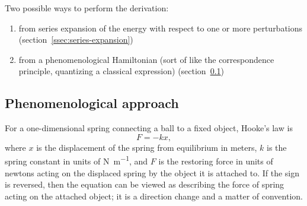 \documentclass[%
class = book,%
crop = false,%
float = true,%
multi = true,%
preview = false,%
]{standalone}
\begin{document}
Two possible ways to perform the derivation:

\begin{enumerate}
\item from series expansion of the energy with respect to one or more perturbations (section~\ref{ssec:series-expansion})
\item from a phenomenological Hamiltonian (sort of like the correspondence principle, quantizing a classical expression) (section~\ref{ssec:phenomenological-approach})
\end{enumerate}

\subsection{Phenomenological approach}
\label{ssec:phenomenological-approach}

For a one-dimensional spring connecting a ball to a fixed object, Hooke's law is
\begin{equation}
  \label{eq:hooke_1d}
  F = -k x,
\end{equation}
where \(x\) is the displacement of the spring from equilibrium in meters, \(k\) is the spring constant in units of \si{\newton\per\meter}, and \(F\) is the restoring force in units of newtons acting on the displaced spring by the object it is attached to. If the sign is reversed, then the equation can be viewed as describing the force of spring acting on the attached object; it is a direction change and a matter of convention.
\end{document}

